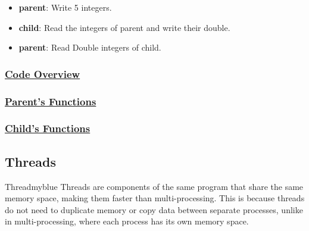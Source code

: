 \begin{itemize}
    \item \textbf{parent}: Write 5 integers.
    \item \textbf{child}: Read the integers of parent and write their double.
    \item \textbf{parent}: Read Double integers of child.
\end{itemize}

\newpage
\null
\subsubsection*{\underline{Code Overview}}

\newpage
\subsubsection*{\underline{Parent's Functions}}

\subsubsection*{\underline{Child's Functions}}


\vspace{0.5cm}

\subsection{Threads}

\begin{prettyBox}{Thread}{myblue}
    Threads are components of the same program that share the same memory space, making them faster than multi-processing. This is because threads do not need to duplicate memory or copy data between separate processes, unlike in multi-processing, where each process has its own memory space.
\end{prettyBox}

